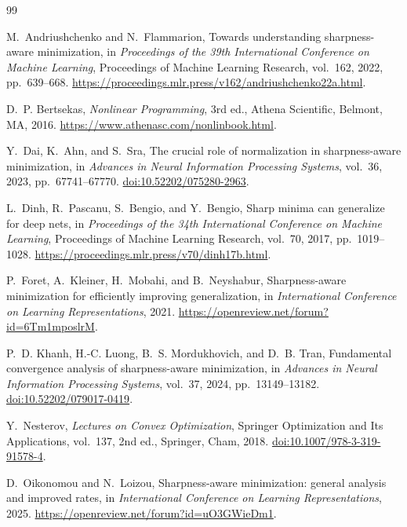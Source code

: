 \documentclass[11pt]{article}
\theoremstyle{remark}
\begin{document}
\begin{thebibliography}{99}
\setlength{\itemsep}{0.5em}

M.~Andriushchenko and N.~Flammarion,
Towards understanding sharpness-aware minimization,
in \emph{Proceedings of the 39th International Conference on Machine
Learning}, Proceedings of Machine Learning Research, vol.~162, 2022,
pp.~639--668.
\url{https://proceedings.mlr.press/v162/andriushchenko22a.html}.

D.~P. Bertsekas,
\emph{Nonlinear Programming}, 3rd ed.,
Athena Scientific, Belmont, MA, 2016.
\url{https://www.athenasc.com/nonlinbook.html}.

Y.~Dai, K.~Ahn, and S.~Sra,
The crucial role of normalization in sharpness-aware minimization,
in \emph{Advances in Neural Information Processing Systems},
vol.~36, 2023, pp.~67741--67770.
\href{https://doi.org/10.52202/075280-2963}
{doi:10.52202/075280-2963}.

L.~Dinh, R.~Pascanu, S.~Bengio, and Y.~Bengio,
Sharp minima can generalize for deep nets,
in \emph{Proceedings of the 34th International Conference on Machine
Learning}, Proceedings of Machine Learning Research, vol.~70, 2017,
pp.~1019--1028.
\url{https://proceedings.mlr.press/v70/dinh17b.html}.

P.~Foret, A.~Kleiner, H.~Mobahi, and B.~Neyshabur,
Sharpness-aware minimization for efficiently improving generalization,
in \emph{International Conference on Learning Representations}, 2021.
\url{https://openreview.net/forum?id=6Tm1mposlrM}.

P.~D. Khanh, H.-C. Luong, B.~S. Mordukhovich, and D.~B. Tran,
Fundamental convergence analysis of sharpness-aware minimization,
in \emph{Advances in Neural Information Processing Systems},
vol.~37, 2024, pp.~13149--13182.
\href{https://doi.org/10.52202/079017-0419}
{doi:10.52202/079017-0419}.

Y.~Nesterov,
\emph{Lectures on Convex Optimization},
Springer Optimization and Its Applications, vol.~137,
2nd ed., Springer, Cham, 2018.
\href{https://doi.org/10.1007/978-3-319-91578-4}
{doi:10.1007/978-3-319-91578-4}.

D.~Oikonomou and N.~Loizou,
Sharpness-aware minimization: general analysis and improved rates,
in \emph{International Conference on Learning Representations}, 2025.
\url{https://openreview.net/forum?id=uO3GWieDm1}.


\end{thebibliography}
\end{document}
